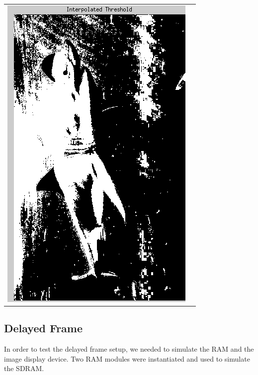 \documentclass[12pt]{article}
\begin{document}
\begin{table}[h!]
\begin{center}
\begin{tabular} {c c}
  \includegraphics[scale=.6]{Images/TotalModule/SmoothThresholded.png}
\end{tabular}
\end{center}
\end{table}


  \subsection{Delayed Frame}
  In order to test the delayed frame setup, we needed to simulate the RAM and the image display device. Two RAM modules were instantiated and used to simulate the SDRAM. 
  
  
\end{document}
